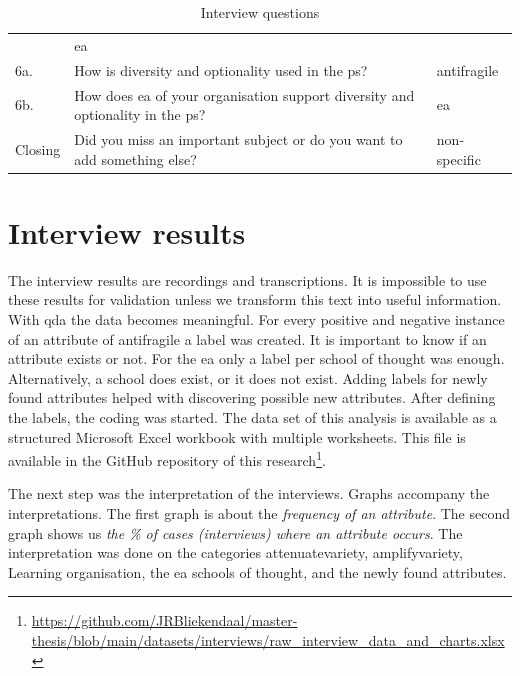 \begin{table}[H]
{\begin{tabular}{@{}p{}p{}p{}@{}}
			& \acrshort{ea} \\%
			6a. & How is \gls{diversity} and \gls{optionality} used in the \gls{ps}? & \Gls{antifragile} \\%
			6b. & How does \acrshort{ea} of your organisation support \gls{diversity} and \gls{optionality} in the \gls{ps}? & \acrshort{ea} \\%
			Closing & Did you miss an important subject or do you want to add something else? & non-specific \\%
			\bottomrule
		\end{tabular}
	}%
		\caption[Interview questions]{Interview questions}
		\label{tab:interviewquestions}
\end{table}
\section{Interview results}
The interview results are recordings and transcriptions. It is impossible to use these results for validation unless we transform this text into useful information. With \acrfull{qda} the data becomes meaningful. For every positive and negative instance of an \gls{attribute} of \gls{antifragile} a label was created. It is important to know if an \gls{attribute} exists or not. For the \acrshort{ea} only a label per school of thought was enough. Alternatively, a school does exist, or it does not exist. Adding labels for newly found attributes helped with discovering possible new attributes. After defining the labels, the coding was started. The data set of this analysis is available as a structured Microsoft Excel workbook with multiple worksheets. This file is available in the GitHub repository of this research\footnote{\url{https://github.com/JRBliekendaal/master-thesis/blob/main/datasets/interviews/raw_interview_data_and_charts.xlsx}}.  

The next step was the interpretation of the interviews. Graphs accompany the interpretations. The first graph is about the \textit{frequency of an \gls{attribute}}. The second graph shows us \textit{the \% of cases (interviews) where an attribute occurs}. The interpretation was done on the categories \gls{attenuatevariety}, \gls{amplifyvariety}, Learning organisation, the \acrlong{ea} schools of thought, and the newly found \glspl{attribute}.
